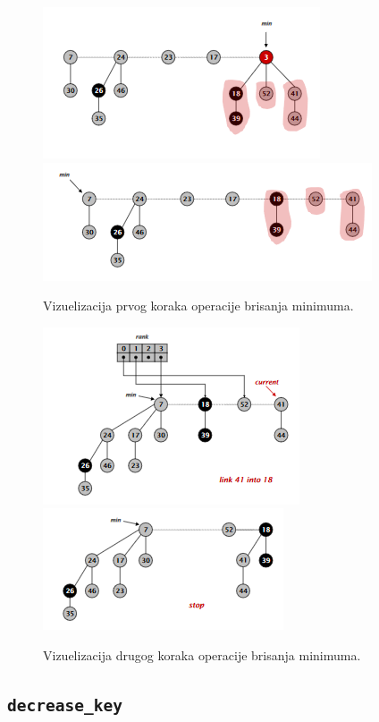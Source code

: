 \documentclass[a4paper]{article}
\theoremstyle{plain}
\theoremstyle{definition}
\begin{document}
\begin{figure}[H]
    \centering
    \includegraphics[scale=0.85]{resources/fig4a.PNG}\\
    \includegraphics[scale=0.85]{resources/fig4b.PNG}
    \caption{Vizuelizacija prvog koraka operacije brisanja minimuma.}
    \label{fig4a}
\end{figure}
\begin{figure}[H]
    \centering
    \includegraphics[scale=0.85]{resources/fig4c.PNG}\\
    \includegraphics[scale=0.85]{resources/fig4d.PNG}
    \caption{Vizuelizacija drugog koraka operacije brisanja minimuma.}
    \label{fig4b}
\end{figure}


\subsection{\texttt{decrease\_key}}
\label{subsec:decreasekey}
\end{document}
